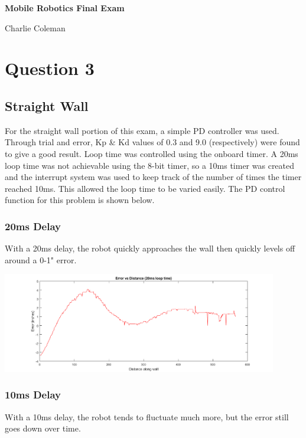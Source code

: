 \documentclass{article}
\begin{document}
	{
	\center \Large \textbf{Mobile Robotics Final Exam}\par
	}
	
	\hfill Charlie Coleman
	
	\section*{Question 3}
	
	\subsection*{Straight Wall}
	
	For the straight wall portion of this exam, a simple PD controller was used. Through trial and error, Kp \& Kd values of 0.3 and 9.0 (respectively) were found to give a good result. Loop time was controlled using the onboard timer. A 20ms loop time was not achievable using the 8-bit timer, so a 10ms timer was created and the interrupt system was used to keep track of the number of times the timer reached 10ms. This allowed the loop time to be varied easily. The PD control function for this problem is shown below.
	
	
	
	\subsubsection*{20ms Delay}
	
	With a 20ms delay, the robot quickly approaches the wall then quickly levels off around a 0-1" error. 
	
	{\centering
	\includegraphics[width=0.9\textwidth]{20msStraightErr}\par
	}
	
	\subsubsection*{10ms Delay}
	
	With a 10ms delay, the robot tends to fluctuate much more, but the error still goes down over time.
	
\end{document}
